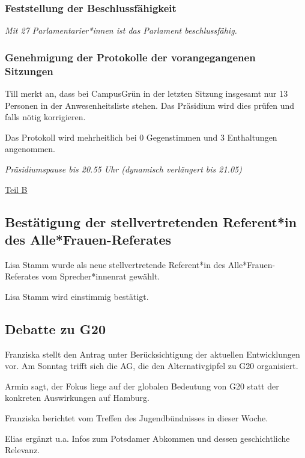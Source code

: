 \documentclass[ngerman,headheight=70pt]{scrartcl}
\begin{document}
    \subsubsection{Feststellung der Beschlussfähigkeit}

    \textit{Mit 27 Parlamentarier*innen ist das Parlament beschlussfähig.}

    \subsubsection{Genehmigung der Protokolle der vorangegangenen Sitzungen}

    Till merkt an, dass bei CampusGrün in der letzten Sitzung insgesamt nur 13
    Personen in der Anwesenheitsliste stehen. Das Präsidium wird dies prüfen
    und falls nötig korrigieren.

    Das Protokoll wird mehrheitlich bei 0 Gegenstimmen und 3 Enthaltungen
    angenommen.

    \textit{Präsidiumspause bis 20.55 Uhr (dynamisch verlängert bis 21.05)}

    \vspace{0.5cm}
    {\Large \underline{Teil B}}

    \subsection{Bestätigung der stellvertretenden Referent*in des Alle*Frauen-Referates}

    Lisa Stamm wurde als neue stellvertretende Referent*in des Alle*Frauen-Referates
    vom Sprecher*innenrat gewählt.

    Lisa Stamm wird einstimmig bestätigt.

    \subsection{Debatte zu G20}

    Franziska stellt den Antrag unter Berücksichtigung der aktuellen Entwicklungen
    vor. Am Sonntag trifft sich die AG, die den Alternativgipfel zu G20 organisiert.

    Armin sagt, der Fokus liege auf der globalen Bedeutung von G20 statt der konkreten
    Auswirkungen auf Hamburg.

    Franziska berichtet vom Treffen des Jugendbündnisses in dieser Woche.

    Elias ergänzt u.a. Infos zum Potsdamer Abkommen und dessen geschichtliche Relevanz.
\end{document}
